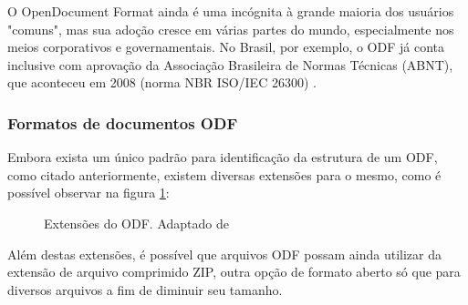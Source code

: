 \begin{citacao}
O OpenDocument Format ainda é uma incógnita à grande maioria dos usuários "comuns", mas sua adoção cresce em várias partes do mundo, especialmente nos meios corporativos e governamentais. No Brasil, por exemplo, o ODF já conta inclusive com aprovação da Associação Brasileira de Normas Técnicas (ABNT), que aconteceu em 2008 (norma NBR ISO/IEC 26300)
\cite{ALECRIM 2006}. \end{citacao}

\subsubsection{Formatos de documentos ODF}
Embora exista um único padrão para identificação da estrutura de um ODF, como citado anteriormente, existem diversas extensões para o mesmo, como é possível observar na figura \ref{extensoes_odf}:
\begin{figure}[ht]
    \centering
    \caption{Extensões do ODF. Adaptado de \cite{Wikipedia 2010 ODF}}
    \label{extensoes_odf}
\end{figure}
Além destas extensões, é possível que arquivos ODF possam ainda utilizar da extensão de arquivo comprimido ZIP, outra opção de formato aberto só que para diversos arquivos a fim de diminuir seu tamanho.

